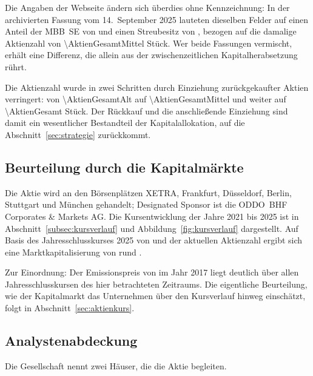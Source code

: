 Die Angaben der Webseite \"andern sich \"uberdies ohne Kennzeichnung: In der
archivierten Fassung vom 14.~September 2025 lauteten dieselben Felder auf
einen Anteil der MBB~SE von \Pct{\AnteilMBBAlt} und einen Streubesitz von
\Pct{\FreefloatAnteilAlt}, bezogen auf die damalige Aktienzahl von
\num{\AktienGesamtMittel}
St\"uck.
Wer beide Fassungen vermischt, erh\"alt eine Differenz, die allein aus der
zwischenzeitlichen Kapitalherabsetzung r\"uhrt.

Die Aktienzahl wurde in zwei Schritten durch Einziehung zur\"uckgekaufter
Aktien verringert: von \num{\AktienGesamtAlt} auf \num{\AktienGesamtMittel}
und weiter auf \num{\AktienGesamt}
St\"uck. Der R\"uckkauf und die anschlie{\ss}ende
Einziehung sind damit ein wesentlicher Bestandteil der Kapitalallokation, auf
die Abschnitt~\ref{sec:strategie} zur\"uckkommt.

\subsection{Beurteilung durch die Kapitalm\"arkte}
\label{subsec:kapitalmarkt}

Die Aktie wird an den B\"orsenpl\"atzen XETRA, Frankfurt, D\"usseldorf,
Berlin, Stuttgart und M\"unchen gehandelt; Designated Sponsor ist die
ODDO~BHF Corporates \& Markets
AG.
Die Kursentwicklung der Jahre 2021 bis 2025 ist in
Abschnitt~\ref{subsec:kursverlauf} und Abbildung~\ref{fig:kursverlauf}
dargestellt. Auf Basis des Jahresschlusskurses 2025 von
\EURje{\KursSilvesterZFV} und der aktuellen Aktienzahl ergibt sich eine
Marktkapitalisierung von rund \MioEUR{\MarktkapZFV}.

Zur Einordnung: Der Emissionspreis von \EURje{\IPOKurs} im Jahr 2017 liegt
deutlich \"uber allen Jahresschlusskursen des hier betrachteten Zeitraums.
Die eigentliche Beurteilung, wie der Kapitalmarkt das Unternehmen \"uber den
Kursverlauf hinweg einsch\"atzt, folgt in Abschnitt~\ref{sec:aktienkurs}.

\subsection{Analystenabdeckung}
\label{subsec:analysten}

Die Gesellschaft nennt zwei H\"auser, die die Aktie
begleiten.

